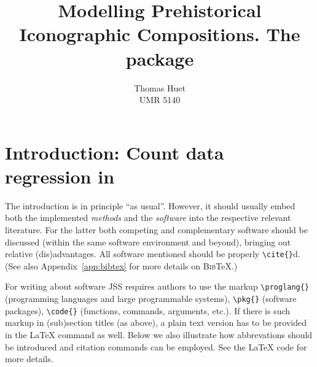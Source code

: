 \documentclass[article]{jss}
\author{Thomas Huet\\UMR 5140}
\title{Modelling Prehistorical Iconographic Compositions. The \proglang{R} package \pkg{decorr}}
\begin{document}





\section[Introduction: Count data regression in R]{Introduction: Count data regression in } \label{sec:intro}

\begin{leftbar}
The introduction is in principle ``as usual''. However, it should usually embed
both the implemented \emph{methods} and the \emph{software} into the respective
relevant literature. For the latter both competing and complementary software
should be discussed (within the same software environment and beyond), bringing
out relative (dis)advantages. All software mentioned should be properly
\verb|\cite{}|d. (See also Appendix~\ref{app:bibtex} for more details on
\textsc{Bib}{\TeX}.)

For writing about software JSS requires authors to use the markup
\verb|\proglang{}| (programming languages and large programmable systems),
\verb|\pkg{}| (software packages), \verb|\code{}| (functions, commands,
arguments, etc.). If there is such markup in (sub)section titles (as above), a
plain text version has to be provided in the {\LaTeX} command as well. Below we
also illustrate how abbrevations should be introduced and citation commands can
be employed. See the {\LaTeX} code for more details.
\end{leftbar}
\end{document}
